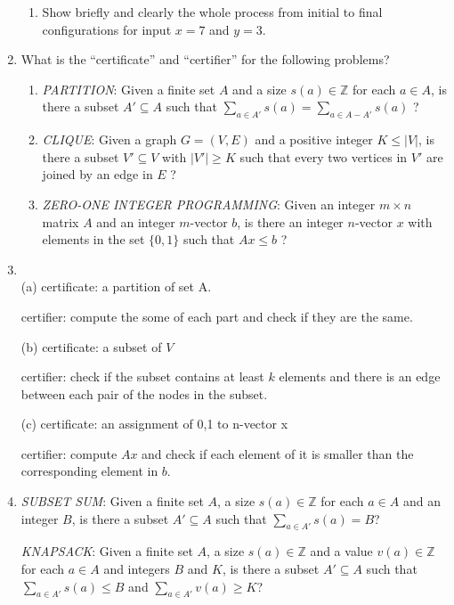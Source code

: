 \documentclass[12pt,a4paper]{article}
\makeatletter
\newtheorem*{solution}{Solution}
\theoremstyle{definition}
\renewenvironment{solution}[1][Solution] {\par\pushQED{\qed}\normalfont\topsep6\p@\@plus6\p@\relax\trivlist\item[\hskip\labelsep\bfseries#1\@addpunct{.}]\ignorespaces}{\popQED\endtrivlist\@endpefalse} \makeatother
\makeatother
\begin{document}
\begin{enumerate}
\begin{enumerate}
        \item
        Show briefly and clearly the whole process from initial to final configurations for input $x = 7$ and $y = 3$.
    \end{enumerate}

    \item
    What is the ``certificate'' and ``certifier'' for the following problems?
    \begin{enumerate}
        \item
        \emph{PARTITION}: Given a finite set $A$ and a size $s(a) \in \mathbb{Z}$ for each $a \in A$, is there a subset $A' \subseteq A$ such that $\sum_{a \in A'}s(a) = \sum_{a \in A-A'}s(a)$ ?

        \item
        \emph{CLIQUE}: Given a graph $G = (V, E)$ and a positive integer $K \leq |V|$, is there a subset $V' \subseteq V$ with $|V'| \geq K$ such that every two vertices in $V'$ are joined by an edge in $E$ ?

        \item
        \emph{ZERO-ONE INTEGER PROGRAMMING}: Given an integer $m \times n$ matrix $A$ and an integer $m$-vector $b$, is there an integer $n$-vector $x$ with elements in the set $\{0, 1\}$ such that $Ax \leq b$ ?
    \end{enumerate}
	\begin{solution}
		~\\
		(a) certificate: a partition of set A.  
		
		certifier: compute the some of each part and check if they are the same.
		
		(b) certificate: a subset of $V$
		
		certifier: check if the subset contains at least $k$ elements and there is an edge between each pair of the nodes in the subset.
		
		(c) certificate: an assignment of {0,1} to n-vector x
		
		certifier: compute $Ax$ and check if each element of it is smaller than the corresponding element in $b$.
	\end{solution}
    \item
    \emph{SUBSET SUM}: Given a finite set $A$, a size $s(a) \in \mathbb{Z}$ for each $a \in A$ and an integer $B$, is there a subset $A' \subseteq A$ such that $\sum_{a \in A'}s(a) = B$?

    \emph{KNAPSACK}: Given a finite set $A$, a size $s(a) \in \mathbb{Z}$ and a value $v(a) \in \mathbb{Z}$ for each $a \in A$ and integers $B$ and $K$, is there a subset $A' \subseteq A$ such that $\sum_{a \in A'}s(a) \leq B$ and $\sum_{a \in A'}v(a) \geq K$?


\end{enumerate}
\end{document}
